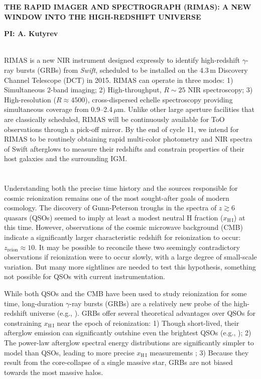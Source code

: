 \documentclass[letterpaper,11pt]{article}
\begin{document}
\pagestyle{plain}

\begin{center} 
\bfseries\uppercase{The Rapid IMAger and Spectrograph (RIMAS): A New Window
	into the High-Redshift Universe}
\end{center}
\vspace{-0.3cm}
\centerline{\bf PI: {A. Kutyrev}}
 
\smallskip\\
RIMAS is a new NIR instrument designed expressly to identify high-redshift 
$\gamma$-ray bursts (GRBs) from \textit{Swift}, scheduled to be installed on the 
4.3\,m Discovery Channel Telescope (DCT) in 2015. RIMAS can operate in three modes: 1) 
Simultaneous 2-band imaging; 2) High-throughput, $R \sim 25$ NIR spectroscopy; 3) 
High-resolution ($R \approx 4500$), cross-dispersed echelle spectroscopy providing 
simultaneous coverage from 0.9--2.4\,$\mu$m. Unlike other large aperture facilities that 
are classically scheduled, RIMAS will be continuously available for ToO observations 
through a pick-off mirror. By the end of cycle 11, we intend for RIMAS to be routinely 
obtaining rapid multi-color photometry and NIR spectra of Swift afterglows to measure 
their redshifts and constrain properties of their host galaxies and the surrounding 
IGM. \\

\smallskip\\
\smallskip\\
Understanding both the precise time history and the sources responsible for cosmic
reionization remains one of the most sought-after goals of modern cosmology.  The 
discovery of Gunn-Peterson troughs in the spectra of $z \gtrsim 6$ quasars 
(QSOs\cite{bfw+01}) seemed to imply at least a modest neutral H fraction 
($x_{\mathrm{H\,I}}$) at this time.  However, observations of the cosmic microwave
background (CMB\cite{hlk+13}) indicate a significantly larger characteristic redshift 
for reionization to occur: $z_\mathrm{reion} \approx 10$.  It may be 
possible to reconcile these two seemingly contradictory observations if reionization
were to occur slowly, with a large degree of small-scale variation.  But many more
sightlines are needed to test this hypothesis, something not possible for QSOs
with current instrumentation.

While both QSOs and the CMB have been used to study reionization for some time, 
long-duration $\gamma$-ray bursts (GRBs) are a relatively new probe of the high-redshift 
universe (e.g., \cite{lr00}).  GRBs offer several theoretical advantages over QSOs
for constraining $x_{\mathrm{H\,I}}$ near the epoch of reionization: 1) Though
short-lived, their afterglow emission can significantly outshine even the brightest
QSOs (e.g., \cite{rks+08,bpl+09,kmk07}); 2) The power-law afterglow spectral energy 
distributions are significantly simpler to model than QSOs, leading to more precise 
$x_{\mathrm{H\,I}}$ measurements \cite{mlz+08}; 3) Because they result from the 
core-collapse of a single massive star, GRBs are not biased towards the most massive halos\cite{mlz+08}.
\end{document}
